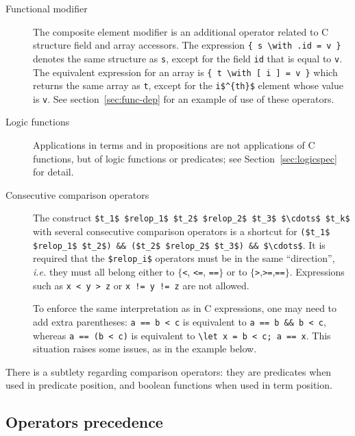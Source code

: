 \begin{description}
\item[Functional modifier]
  The composite element modifier is an additional
  operator related to C structure field and array accessors.
  The expression \lstinline|{ s \with .id = v }|
  denotes the same structure as \lstinline|s|, except for the field
  \lstinline|id| that is equal to \lstinline|v|.
  The equivalent expression for an array is
  \lstinline|{ t \with [ i ] = v }|
  which returns the same array as \lstinline|t|, except for the
  \lstinline|i$^{th}$| element whose value
  is \lstinline|v|.
  See section~\ref{sec:func-dep} for an example of use of these operators.

\item[Logic functions] Applications in terms and in propositions are not
applications of C functions, but of logic functions or predicates; see
Section~\ref{sec:logicspec} for detail.

\item[Consecutive comparison operators]
  The construct
\lstinline|$t_1$ $relop_1$ $t_2$ $relop_2$ $t_3$ $\cdots$ $t_k$| with
  several consecutive comparison operators is a shortcut for
  \lstinline|($t_1$ $relop_1$ $t_2$) && ($t_2$ $relop_2$ $t_3$) && $\cdots$|.
  It is required that the \lstinline|$relop_i$| operators must be in
  the same ``direction'', \emph{i.e.} they must all belong either to
  $\{$\lstinline|<|, \lstinline|<=|, \lstinline|==|$\}$ or to
  $\{$\lstinline|>|,\lstinline|>=|,\lstinline|==|$\}$. Expressions such as
  \lstinline|x < y > z| or \lstinline|x != y != z| are not allowed.

  To enforce the same interpretation as in C expressions, one may need
  to add extra parentheses: \lstinline|a == b < c| is equivalent
  to \lstinline|a == b && b < c|, whereas
  \lstinline |a == (b < c)| is
  equivalent to \lstinline|\let x = b < c; a == x|.
  This situation raises some issues, as in the example below.

\end{description}

There is a subtlety regarding comparison operators: they are
predicates when used in predicate position, and boolean functions when
used in term position.
\begin{example}

\end{example}

\subsection{Operators precedence}

